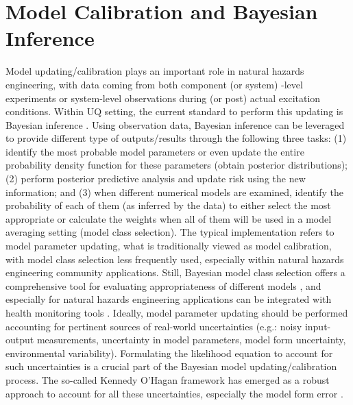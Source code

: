 \section{Model Calibration and Bayesian Inference}
\label{sec:uq_calibration}

Model updating/calibration plays an important role in natural hazards engineering, with data coming from both component (or system) -level experiments or system-level observations during (or post) actual excitation conditions. Within UQ setting, the current standard to perform this updating is Bayesian inference \citep{beck2010bayesian,kontoroupi2017online}. Using observation data, Bayesian inference can be leveraged to provide different type of outputs/results \citep{beck2013prior} through the following three tasks: (1) identify the most probable model parameters or even update the entire probability density function for these parameters (obtain posterior distributions); (2) perform posterior predictive analysis and update risk using the new information; and (3) when different numerical models are examined, identify the probability of each of them (as inferred by the data) to either select the most appropriate or calculate the weights when all of them will be used in a model averaging setting (model class selection). The typical implementation refers to model parameter updating, what is traditionally viewed as model calibration, with model class selection less frequently used, especially within natural hazards engineering community applications. Still, Bayesian model class selection offers a comprehensive tool for evaluating appropriateness of different models \citep{muto2008bayesian}, and especially for natural hazards engineering applications can be integrated with health monitoring tools \citep{oh2018bayesian}. Ideally, model parameter updating should be performed accounting for pertinent sources of real-world uncertainties (e.g.: noisy input-output measurements, uncertainty in model parameters, model form uncertainty, environmental variability). Formulating the likelihood equation to account for such uncertainties is a crucial part of the Bayesian model updating/calibration process. The so-called Kennedy O'Hagan framework has emerged as a robust approach to account for all these uncertainties, especially the model form error \citep{kennedy2001bayesian}. 

